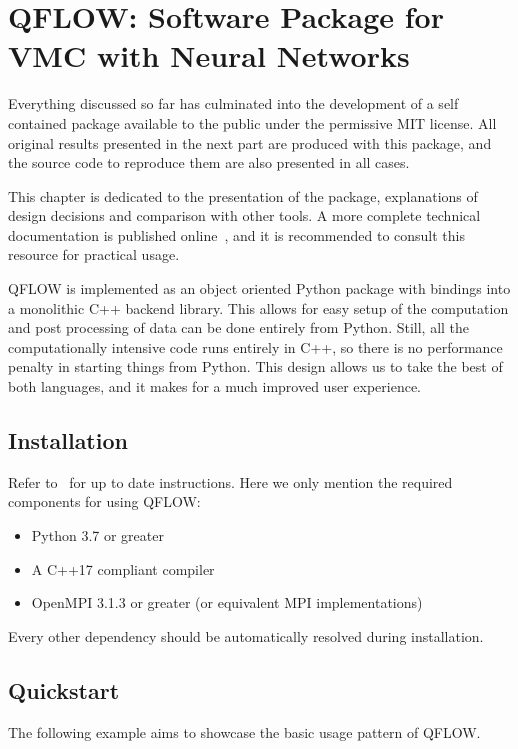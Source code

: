 \documentclass[Thesis.tex]{subfiles}
\begin{document}
\chapter{QFLOW: Software Package for VMC with Neural Networks}
\label{chp:qflow}

Everything discussed so far has culminated into the development of a self
contained package available to the public under the permissive MIT license. All
original results presented in the next part are produced with this package, and
the source code to reproduce them are also presented in all cases.

This chapter is dedicated to the presentation of the package, explanations of
design decisions and comparison with other tools. A more complete technical
documentation is published online~\cite{qflow}, and it is recommended to consult this
resource for practical usage.

QFLOW is implemented as an object oriented Python package with bindings into a monolithic C++
backend library. This allows for easy setup of the computation and post
processing of data can be done entirely from Python. Still, all the
computationally intensive code runs entirely in C++, so there is no performance
penalty in starting things from Python. This design allows us to take the best
of both languages, and it makes for a much improved user experience.

\section{Installation}

Refer to~\cite{qflow} for up to date instructions. Here we only mention the
required components for using QFLOW:

\begin{itemize}
  \item Python 3.7 or greater
  \item A C++17 compliant compiler
  \item OpenMPI 3.1.3 or greater (or equivalent MPI implementations)
\end{itemize}
Every other dependency should be automatically resolved during installation.

\section{Quickstart}

The following example aims to showcase the basic usage pattern of QFLOW.
\end{document}
